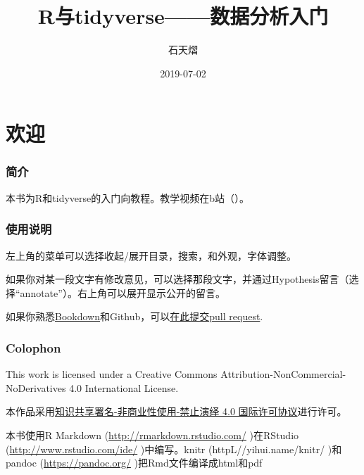 \documentclass[]{book}
\title{R与tidyverse------数据分析入门}
\author{石天熠}
\date{2019-07-02}
\begin{document}
\maketitle

{
\setcounter{tocdepth}{1}
\tableofcontents
}
\hypertarget{welcome}{%
\chapter*{欢迎}\label{welcome}}

\hypertarget{ux7b80ux4ecb}{%
\subsection*{简介}\label{ux7b80ux4ecb}}

本书为R和tidyverse的入门向教程。教学视频在b站（）。

\hypertarget{ux8bf4ux660e}{%
\subsection*{使用说明}\label{ux8bf4ux660e}}

左上角的菜单可以选择收起/展开目录，搜索，和外观，字体调整。

如果你对某一段文字有修改意见，可以选择那段文字，并通过Hypothesis留言（选择``annotate''）。右上角可以展开显示公开的留言。

如果你熟悉\href{https://bookdown.org}{Bookdown}和Github，可以\href{https://github.com/TianyiShi2001/R-Tutorial-Resorces}{在此提交pull request}.

\hypertarget{colophon}{%
\subsection*{Colophon}\label{colophon}}

This work is licensed under a Creative Commons Attribution-NonCommercial-NoDerivatives 4.0 International License.
\doclicenseThis

本作品采用\href{https://creativecommons.org/licenses/by-nc-nd/4.0/deed.zh}{知识共享署名-非商业性使用-禁止演绎 4.0 国际许可协议}进行许可。

本书使用R Markdown (\url{http://rmarkdown.rstudio.com/} )在RStudio (\url{http://www.rstudio.com/ide/} )中编写。knitr (httpL//yihui.name/knitr/ )和pandoc (\url{https://pandoc.org/} )把Rmd文件编译成html和pdf
\end{document}
